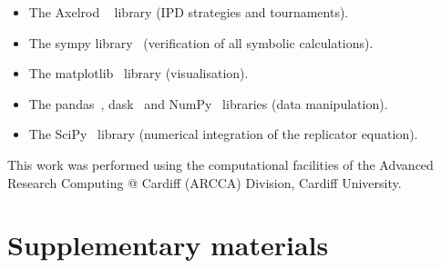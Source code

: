 \documentclass[a4paper]{article}
\begin{document}
\begin{itemize}
    \item The Axelrod ~\cite{Knight2016, Knight2018} library (IPD strategies and
        tournaments).
    \item The sympy library~\cite{Meurer2017} (verification of all symbolic
        calculations).
    \item The matplotlib~\cite{Droettboom2018} library (visualisation).
    \item The pandas~\cite{Structures2010}, dask~\cite{Dask2016} and
        NumPy~\cite{Oliphant2015} libraries (data manipulation).
    \item The SciPy~\cite{Jones2001} library (numerical integration of the
        replicator equation).
\end{itemize}

This work was performed using the computational facilities of the Advanced
Research Computing @ Cardiff (ARCCA) Division, Cardiff University.

\printbibliography

\newpage
\section*{Supplementary materials}




\end{document}
